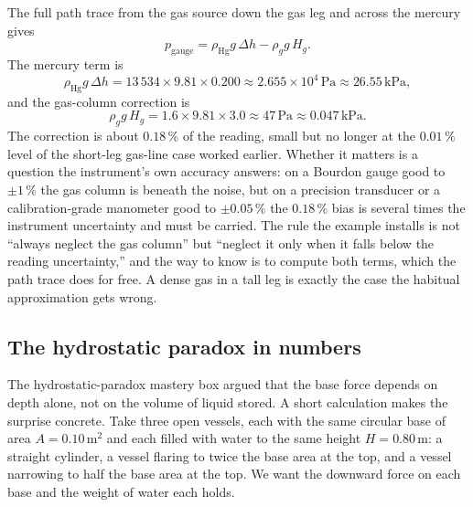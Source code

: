 The full path trace from the gas source down the gas leg and across the
mercury gives
\[
p_{\text{gauge}} = \rho_{\text{Hg}} g\,\Delta h - \rho_g g\,H_g.
\]
The mercury term is
\[
\rho_{\text{Hg}} g\,\Delta h
= 13\,534 \times 9.81 \times 0.200
\approx 2.655 \times 10^4\,\text{Pa}
\approx 26.55\,\text{kPa},
\]
and the gas-column correction is
\[
\rho_g g\,H_g
= 1.6 \times 9.81 \times 3.0
\approx 47\,\text{Pa}
\approx 0.047\,\text{kPa}.
\]
The correction is about $0.18\,\%$ of the reading, small but no longer at
the $0.01\,\%$ level of the short-leg gas-line case worked earlier. Whether
it matters is a question the instrument's own accuracy answers: on a
Bourdon gauge good to $\pm 1\,\%$ the gas column is beneath the noise, but
on a precision transducer or a calibration-grade manometer good to
$\pm 0.05\,\%$ the $0.18\,\%$ bias is several times the instrument
uncertainty and must be carried. The rule the example installs is not
``always neglect the gas column'' but ``neglect it only when it falls below
the reading uncertainty,'' and the way to know is to compute both terms,
which the path trace does for free. A dense gas in a tall leg is exactly the
case the habitual approximation gets wrong.

\subsection{The hydrostatic paradox in numbers}

The hydrostatic-paradox mastery box argued that the base force depends on
depth alone, not on the volume of liquid stored. A short calculation makes
the surprise concrete. Take three open vessels, each with the same circular
base of area $A = 0.10\,\text{m}^2$ and each filled with water to the same
height $H = 0.80\,\si{\meter}$: a straight cylinder, a vessel flaring to
twice the base area at the top, and a vessel narrowing to half the base area
at the top. We want the downward force on each base and the weight of water
each holds.

